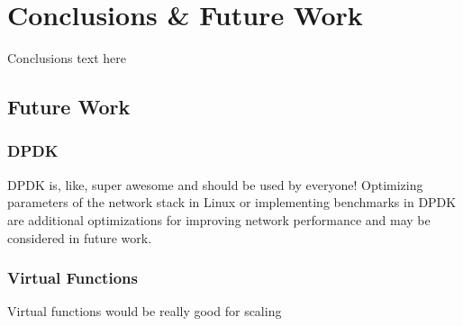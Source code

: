 \chapter{Conclusions \& Future Work}
\label{sec:conclusions}
Conclusions text here


\section{Future Work}
\label{sec:future_work}
\subsection{DPDK}
DPDK is, like, super awesome and should be used by everyone!
Optimizing parameters of the network stack in Linux or implementing benchmarks in DPDK are additional optimizations for improving network performance and may be considered in future work.

\subsection{Virtual Functions}
\label{sec:virtual_functions}
Virtual functions would be really good for scaling

